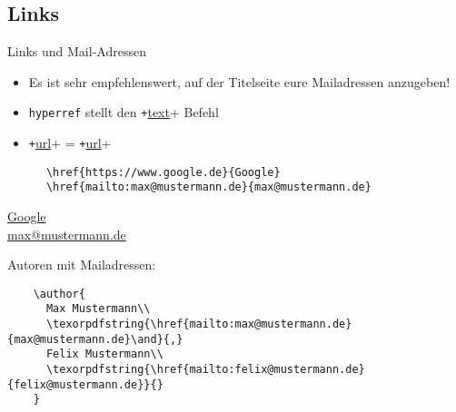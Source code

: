 \subsection{Links}
\begin{frame}[fragile]{Links und Mail-Adressen}
  \begin{itemize}
    \item Es ist sehr empfehlenswert, auf der Titelseite eure Mailadressen anzugeben!
    \item \texttt{hyperref} stellt den \texttt+\href{link}{text}+ Befehl
    \item \texttt+\url{url}+ = \texttt+\href{url}{url}+
  \end{itemize}
  \vspace{-0.6em}
  \begin{CodeExample}{0.75}
    \begin{verbatim}
      \href{https://www.google.de}{Google}
      \href{mailto:max@mustermann.de}{max@mustermann.de}
    \end{verbatim}
  \CodeResult
    \strut
    \href{www.google.de}{Google}\\
    \href{mailto:max@mustermann.de}{max@mustermann.de}
  \end{CodeExample}
  \begin{block}{Autoren mit Mailadressen:}
    \begin{verbatim}
    \author{
      Max Mustermann\\
      \texorpdfstring{\href{mailto:max@mustermann.de}{max@mustermann.de}\and}{,}
      Felix Mustermann\\
      \texorpdfstring{\href{mailto:felix@mustermann.de}{felix@mustermann.de}}{}
    }
    \end{verbatim}
  \end{block}
\end{frame}
